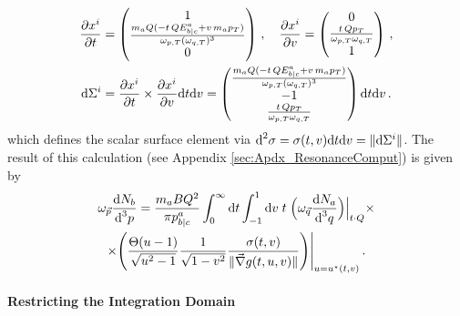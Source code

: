 \begin{gather}
    \frac{\partial x^i}{\partial t}
        =\begin{pmatrix}
            1\\
            \frac{m_aQ(-t\,QE^a_{b\vert c}+v\,m_a p_T)}{\omega_{p,T}(\omega_{q,T})^3}\\
            0
        \end{pmatrix}\,,\quad
    \frac{\partial x^i}{\partial v}=\begin{pmatrix}
        0\\
        \frac{t\,Qp_T}{\omega_{p,T}\omega_{q,T}}\\
        1
    \end{pmatrix}\,,\\
    \text{d}\Sigma^i=\frac{\partial x^i}{\partial t}\times \frac{\partial x^i}{\partial v}\text{d} t\text{d} v=\begin{pmatrix}
        \frac{m_aQ(-t\,QE^a_{b\vert c}+v\,m_a p_T)}{\omega_{p,T}(\omega_{q,T})^3}\\
        -1\\
        \frac{t\,Qp_T}{\omega_{p,T}\omega_{q,T}}
    \end{pmatrix}\text{d} t\text{d} v\,.
\end{gather}
which defines the scalar surface element via $\text{d}^2\sigma=\sigma(t,v)\text{d} t\text{d} v=\Vert\text{d}\Sigma^i\Vert$. The result of this calculation (see Appendix \ref{sec:Apdx_ResonanceComput}) is given by
\begin{multline}
    \omega_{\vec{p}}\frac{\text{d} N_b}{\text{d}^3p}=\frac{m_aBQ^2}{\pi p^a_{b\vert c}}\int_0^\infty\text{d} t\int_{-1}^1\text{d} v\;t\;\Big(\omega_{\vec{q}}\frac{\text{d} N_a}{\text{d}^3 q}\Big)\Big\vert_{t\cdot Q }\times\\
    \times\Bigg(\frac{\Theta(u-1)}{\sqrt{u^2-1}}\frac{1}{\sqrt{1-v^2}}\frac{\sigma(t,v)}{\Vert\vec{\nabla}g(t,u,v)\Vert}\Bigg)\Bigg\vert_{u=u^\star(t,v)}\,.
    \label{eq:DecayCalc_FinalIntegral}
\end{multline}

\paragraph{Restricting the Integration Domain}

